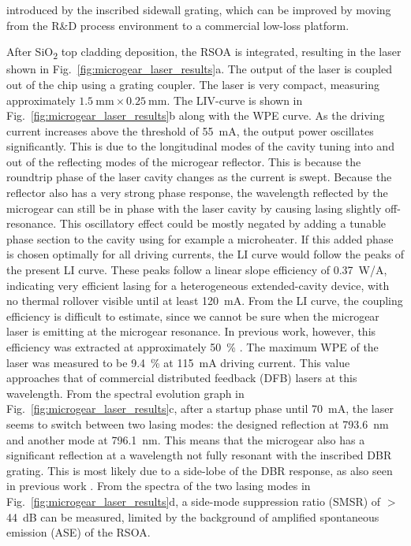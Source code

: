 \documentclass[%
 reprint,
 amsmath,amssymb,
 aps,
]{revtex4-2}
\begin{document}
introduced by the inscribed sidewall grating, which can be improved by moving from the R\&D process environment to a commercial low-loss platform. 

After SiO\textsubscript{2} top cladding deposition, the RSOA is integrated, resulting in the laser shown in Fig.~\ref{fig:microgear_laser_results}a. The output of the laser is coupled out of the chip using a grating coupler. The laser is very compact, measuring approximately $1.5~\text{mm} \times 0.25~\text{mm}$. The LIV-curve is shown in Fig.~\ref{fig:microgear_laser_results}b along with the WPE curve. As the driving current increases above the threshold of 55~mA, the output power oscillates significantly. This is due to the longitudinal modes of the cavity tuning into and out of the reflecting modes of the microgear reflector. This is because the roundtrip phase of the laser cavity changes as the current is swept. Because the reflector also has a very strong phase response, the wavelength reflected by the microgear can still be in phase with the laser cavity by causing lasing slightly off-resonance. This oscillatory effect could be mostly negated by adding a tunable phase section to the cavity using for example a microheater. If this added phase is chosen optimally for all driving currents, the LI curve would follow the peaks of the present LI curve. These peaks follow a linear slope efficiency of 0.37~W/A, indicating very efficient lasing for a heterogeneous extended-cavity device, with no thermal rollover visible until at least 120~mA. From the LI curve, the coupling efficiency is difficult to estimate, since we cannot be sure when the microgear laser is emitting at the microgear resonance. In previous work, however, this efficiency was extracted at approximately 50~\% \cite{kiewiet2026micro}. The maximum WPE of the laser was measured to be 9.4~\% at 115~mA driving current. This value approaches that of commercial distributed feedback (DFB) lasers at this wavelength.
From the spectral evolution graph in Fig.~\ref{fig:microgear_laser_results}c, after a startup phase until 70~mA, the laser seems to switch between two lasing modes: the designed reflection at 793.6~nm and another mode at 796.1~nm. This means that the microgear also has a significant reflection at a wavelength not fully resonant with the inscribed DBR grating. This is most likely due to a side-lobe of the DBR response, as also seen in previous work \cite{reep2025compact}. From the spectra of the two lasing modes in Fig.~\ref{fig:microgear_laser_results}d, a side-mode suppression ratio (SMSR) of $>$44~dB can be measured, limited by the background of amplified spontaneous emission (ASE) of the RSOA. 
\end{document}
